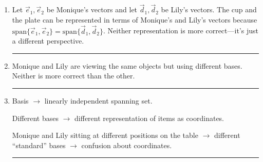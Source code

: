\documentclass{article}
\begin{document}
	\Large\bf

	\medskip


	\begin{enumerate}
		\color{Violet} \vspace{.2cm} \hrule

		\item Let $\vec e_1,\vec e_2$ be Monique's vectors and let $\vec d_1,\vec d_2$ be Lily's vectors.
			The cup and the plate can be represented in terms of Monique's and
			Lily's vectors because $\mathrm{span}\{\vec e_1,\vec e_2\}=\mathrm{span}\{\vec d_1,\vec d_2\}$.
			Neither representation is more correct---it's just a different perspective.

			\vspace{.2cm} \hrule

		\item Monique and Lily are viewing the same objects but using different bases. Neither is more
			correct than the other.

			\vspace{.2cm} \hrule

		\item Basis $\to$ linearly independent spanning set. 

			Different bases $\to$ different representation
			of items as coordinates. 

			Monique and Lily sitting at different positions on the table $\to$ different
			``standard'' bases $\to$ confusion about coordinates.
			 \vspace{.2cm} \hrule
	\end{enumerate}
\end{document}
